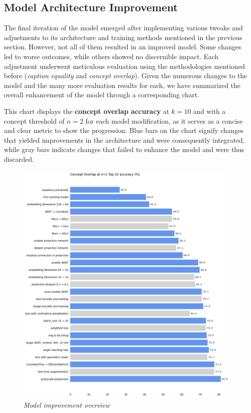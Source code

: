 \documentclass[10pt,twocolumn,letterpaper]{article}
\begin{document}
\subsection{Model Architecture Improvement}

The final iteration of the model emerged after implementing various tweaks and adjustments to its architecture and training methods mentioned in the previous section. However, not all of them resulted in an improved model. Some changes led to worse outcomes, while others showed no discernible impact. Each adjustment underwent meticulous evaluation using the methodologies mentioned before (\textit{caption equality} and \textit{concept overlap}). Given the numerous changes to the model and the many more evaluation results for each, we have summarized the overall enhancement of the model through a corresponding chart.

This chart displays the \textbf{concept overlap accuracy} at $k=10$ and with a concept threshold of $n=2$ for each model modification, as it serves as a concise and clear metric to show the progression. Blue bars on the chart signify changes that yielded improvements in the architecture and were consequently integrated, while gray bars indicate changes that failed to enhance the model and were thus discarded.

\begin{figure}[H]
    \centering
    \includegraphics[width=1\linewidth]{img/Improvement_Plot.png}
    \caption{\textit{Model improvement overview}}
\end{figure}
\end{document}
